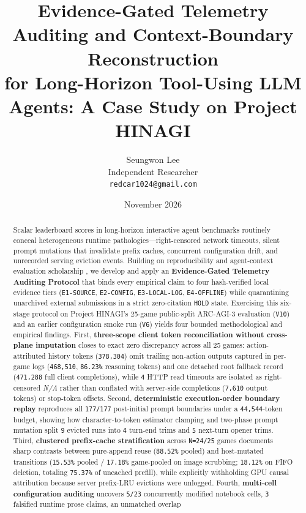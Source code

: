 \documentclass[10pt]{article}
\newcommand{\code}[1]{\texttt{#1}}
\newcommand{\na}{\textit{N/A}}
\begin{document}
\title{\vspace{-1.0em}\textbf{\Large Evidence-Gated Telemetry Auditing and Context-Boundary Reconstruction\\for Long-Horizon Tool-Using LLM Agents: A Case Study on Project HINAGI}}

\author{Seungwon Lee \\
\small Independent Researcher \\
\small \texttt{redcar1024@gmail.com}}

\date{November 2026}
\sloppy
\maketitle

\begin{abstract}
Scalar leaderboard scores in long-horizon interactive agent benchmarks routinely conceal heterogeneous runtime pathologies---right-censored network timeouts, silent prompt mutations that invalidate prefix caches, concurrent configuration drift, and unrecorded serving eviction events. Building on reproducibility and agent-context evaluation scholarship \citep{kapoor2025ai,siegel2025corebench,lindenbauer2025complexity}, we develop and apply an \textbf{Evidence-Gated Telemetry Auditing Protocol} that binds every empirical claim to four hash-verified local evidence tiers (\code{E1-SOURCE}, \code{E2-CONFIG}, \code{E3-LOCAL-LOG}, \code{E4-OFFLINE}) while quarantining unarchived external submissions in a strict zero-citation \code{HOLD} state. Exercising this six-stage protocol on Project HINAGI's 25-game public-split ARC-AGI-3 evaluation (\code{V10}) and an earlier configuration smoke run (\code{V6}) yields four bounded methodological and empirical findings. First, \textbf{three-scope client token reconciliation without cross-plane imputation} closes to exact zero discrepancy across all 25 games: action-attributed history tokens (\code{378,304}) omit trailing non-action outputs captured in per-game logs (\code{468,510}, \code{86.23\%} reasoning tokens) and one detached root fallback record (\code{471,288} full client completions), while \code{4} HTTP read timeouts are isolated as right-censored \na{} rather than conflated with server-side completions (\code{7,610} output tokens) or stop-token offsets. Second, \textbf{deterministic execution-order boundary replay} reproduces all \code{177/177} post-initial prompt boundaries under a \code{44,544}-token budget, showing how character-to-token estimator clamping and two-phase prompt mutation split \code{9} evicted runs into \code{4} turn-end trims and \code{5} next-turn opener trims. Third, \textbf{clustered prefix-cache stratification} across \code{N=24/25} games documents sharp contrasts between pure-append reuse (\code{88.52\%} pooled) and host-mutated transitions (\code{15.53\%} pooled / \code{17.18\%} game-pooled on image scrubbing; \code{18.12\%} on FIFO deletion, totaling \code{75.37\%} of uncached prefill), while explicitly withholding GPU causal attribution because server prefix-LRU evictions were unlogged. Fourth, \textbf{multi-cell configuration auditing} uncovers \code{5/23} concurrently modified notebook cells, \code{3} falsified runtime prose claims, an unmatched overlap 
\end{abstract}
\end{document}
